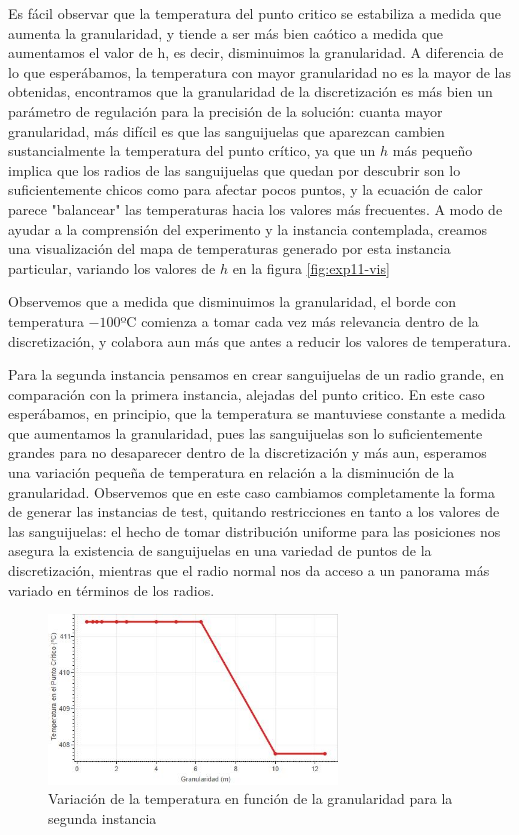 Es fácil observar que la temperatura del punto critico se estabiliza a medida que aumenta la granularidad, y tiende a ser más bien caótico a medida que aumentamos el valor de h, es decir, disminuimos la granularidad. A diferencia de lo que esperábamos, la temperatura con mayor granularidad no es la mayor de las obtenidas, encontramos que la granularidad de la discretización es más bien un parámetro de regulación para la precisión de la solución: cuanta mayor granularidad, más difícil es que las sanguijuelas que aparezcan cambien sustancialmente la temperatura del punto crítico, ya que un $h$ más pequeño implica que los radios de las sanguijuelas que quedan por descubrir son lo suficientemente chicos como para afectar pocos puntos, y la ecuación de calor parece "balancear" las temperaturas hacia los valores más frecuentes. A modo de ayudar a la comprensión del experimento y la instancia contemplada, creamos una visualización del mapa de temperaturas generado por esta instancia particular, variando los valores de $h$ en la figura \ref{fig:exp11-vis}

Observemos que a medida que disminuimos la granularidad, el borde con temperatura $-100$ºC comienza a tomar cada vez más relevancia dentro de la discretización, y colabora aun más que antes a reducir los valores de temperatura.

Para la segunda instancia pensamos en crear sanguijuelas de un radio grande, en comparación con la primera instancia, alejadas del punto critico. En este caso esperábamos, en principio, que la temperatura se mantuviese constante a medida que aumentamos la granularidad, pues las sanguijuelas son lo suficientemente grandes para no desaparecer dentro de la discretización y más aun, esperamos una variación pequeña de temperatura en relación a la disminución de la granularidad. Observemos que en este caso cambiamos completamente la forma de generar las instancias de test, quitando restricciones en tanto a los valores de las sanguijuelas: el hecho de tomar distribución uniforme para las posiciones nos asegura la existencia de sanguijuelas en una variedad de puntos de la discretización, mientras que el radio normal nos da acceso a un panorama más variado en términos de los radios.

\begin{figure}[h]
    \centering
    \includegraphics[width=0.685\textwidth]{experimento 1-2}
    \caption{Variación de la temperatura en función de la granularidad para la segunda instancia}
    \label{fig:exp12}
\end{figure}

